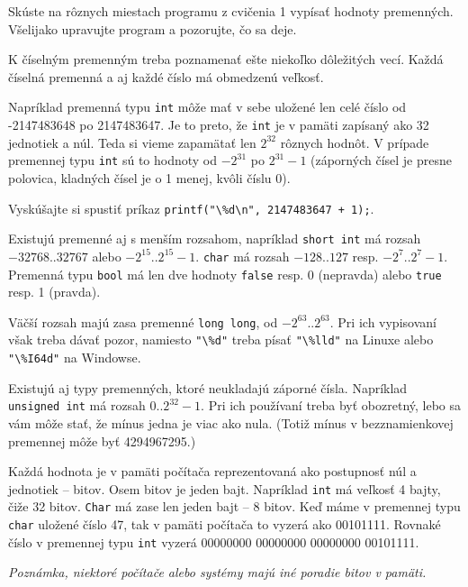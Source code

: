 \cvicenie Skúste na rôznych miestach programu z cvičenia 1 vypísať hodnoty
premenných. Všelijako upravujte program a pozorujte, čo sa deje.
\fakeriesenie


K číselným premenným treba poznamenať ešte niekoľko dôležitých vecí.  Každá
číselná premenná a aj každé číslo má obmedzenú veľkosť.

Napríklad premenná typu \verb!int! môže mať v sebe uložené len celé číslo od
-2147483648 po 2147483647. Je to preto, že \verb!int! je v pamäti zapísaný ako
32 jednotiek a núl. Teda si vieme zapamätať len $2^{32}$ rôznych hodnôt. V
prípade premennej typu \verb!int! sú to hodnoty od $-2^{31}$ po $2^{31}-1$
(záporných čísel je presne polovica, kladných čísel je o 1 menej, kvôli číslu
0).

\cvicenie Vyskúšajte si spustiť príkaz \verb!printf("\%d\n", 2147483647 + 1);!.
\fakeriesenie

\medskip

Existujú premenné aj s menším rozsahom, napríklad \verb!short int! má rozsah
$-32768..32767$ alebo $-2^{15}..2^{15}-1$.  \verb!char! má rozsah $-128..127$
resp. $-2^7..2^7-1$. Premenná typu \verb!bool! má len dve hodnoty 
\verb!false! resp. 0 (nepravda) alebo \verb!true! resp. 1 (pravda).

Väčší rozsah majú zasa premenné \verb!long long!, od $-2^{63}..2^{63}$. Pri ich
vypisovaní však treba dávať pozor, namiesto \verb!"\%d"! treba písať
\verb!"\%lld"! na Linuxe alebo \verb!"\%I64d"! na Windowse.

Existujú aj typy premenných, ktoré neukladajú záporné čísla. Napríklad
\verb!unsigned int! má rozsah $0..2^{32}-1$.  Pri ich používaní treba byť
obozretný, lebo sa vám môže stať, že mínus jedna je viac ako nula.  (Totiž mínus
v bezznamienkovej premennej môže byť 4294967295.)


Každá hodnota je v pamäti počítača reprezentovaná ako postupnosť núl a
jednotiek -- bitov. Osem bitov je jeden bajt. Napríklad \verb!int! má veľkosť 4
bajty, čiže 32 bitov. \verb!Char! má zase len jeden bajt -- 8 bitov. Keď máme v
premennej typu \verb!char! uložené číslo 47, tak v pamäti počítača to vyzerá
ako 00101111. Rovnaké číslo v premennej typu \verb!int! vyzerá 00000000
00000000 00000000 00101111. 

\textit{Poznámka, niektoré počítače alebo systémy majú iné poradie bitov v
pamäti.}

